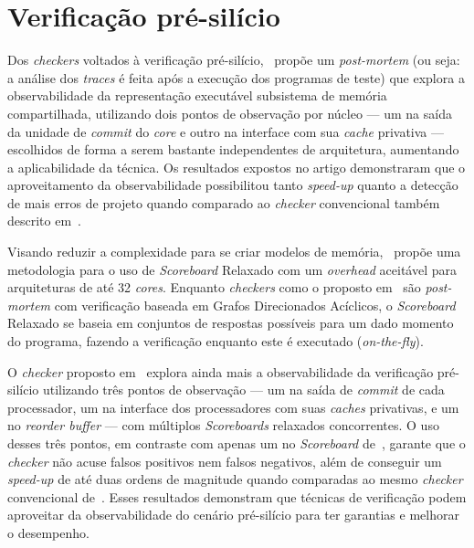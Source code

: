 \section{Verificação pré-silício}

Dos \textit{checkers} voltados à verificação pré-silício,~\cite{Rambo:2012}
propõe um \textit{post-mortem} (ou seja: a análise dos \textit{traces} é
feita após a execução dos programas de teste) que explora a observabilidade
da representação executável subsistema de memória compartilhada, utilizando
dois pontos de observação por núcleo --- um na saída da unidade de
\textit{commit} do \textit{core} e outro na interface com sua
\textit{cache} privativa --- escolhidos de forma a serem bastante
independentes de arquitetura, aumentando a aplicabilidade da técnica. Os
resultados expostos no artigo demonstraram que o aproveitamento da
observabilidade possibilitou tanto \textit{speed-up} quanto a detecção de
mais erros de projeto quando
comparado ao \textit{checker} convencional também descrito
em~\cite{Rambo:2012}.

Visando reduzir a complexidade para se criar modelos de
memória,~\cite{Shacham:2008} propõe uma metodologia para o uso de
\textit{Scoreboard} Relaxado com um \textit{overhead} aceitável para
arquiteturas de até 32 \textit{cores}. Enquanto \textit{checkers} como o
proposto em~\cite{Rambo:2012} são \textit{post-mortem} com verificação
baseada em Grafos Direcionados Acíclicos, o \textit{Scoreboard} Relaxado se
baseia em conjuntos de respostas possíveis para um dado momento do
programa, fazendo a verificação enquanto este é executado
(\textit{on-the-fly}).

O \textit{checker} proposto em~\cite{Freitas:2013} explora ainda mais a
observabilidade da verificação pré-silício utilizando três pontos de
observação --- um na saída de \textit{commit} de cada processador, um na
interface dos processadores com suas \textit{caches} privativas, e um no
\textit{reorder buffer} --- com múltiplos \textit{Scoreboards} relaxados
concorrentes. O uso desses três pontos, em contraste com apenas um no
\textit{Scoreboard} de~\cite{Shacham:2008}, garante que o \textit{checker}
não acuse falsos positivos nem falsos negativos, além de conseguir um
\textit{speed-up} de até duas ordens de magnitude quando comparadas ao
mesmo \textit{checker} convencional de~\cite{Rambo:2012}. Esses resultados
demonstram que técnicas de verificação podem aproveitar da observabilidade
do cenário pré-silício para ter garantias e melhorar o desempenho.

